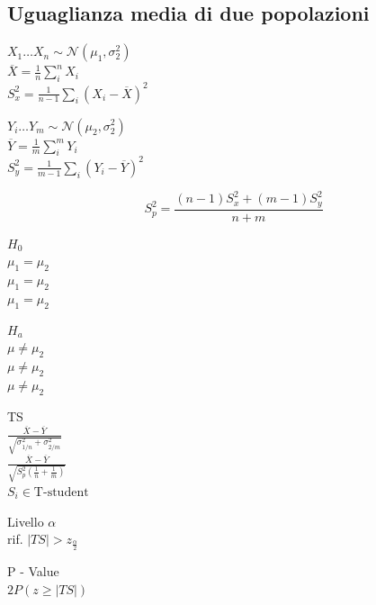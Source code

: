 \documentclass[]{article}
\begin{document}
    \subsection{Uguaglianza media di due popolazioni}
    \begin{minipage}{0.45\textwidth}
        $X_1 \ldots X_n \sim \mathcal{N}(\mu_1, \sigma_2^2)$ \\
        $\overline{X} = \frac{1}{n} \sum_{i}^{n} X_i$ \\
        $S_x^2 = \frac{1}{n - 1} \sum_{i}^{} (X_i - \overline{X})^2$
    \end{minipage}
    \begin{minipage}{0.45\textwidth}
        $Y_i \ldots Y_m \sim \mathcal{N} (\mu_2, \sigma_2^2)$ \\
        $\overline{Y} = \frac{1}{m} \sum_{i}^{m} Y_i$ \\
        $S_y^2 = \frac{1}{m-1} \sum_{i}^{} (Y_i - \overline{Y})^2$
    \end{minipage}
    \[ S_p^2 = \frac{(n-1)S_x^2 + (m-1)S_y^2}{n+m} \]
    \begin{minipage}{0.2\textwidth}
        $H_0$ \\[2ex]
        $\mu_1 = \mu_2$ \\[2ex]
        $\mu_1 = \mu_2$ \\[2ex]
        $\mu_1 = \mu_2$
    \end{minipage}
    \begin{minipage}{0.2\textwidth}
        $H_a$ \\[2ex]
        $\mu \not =  \mu_2$ \\[2ex]
        $\mu \not =  \mu_2$ \\[2ex]
        $\mu \not =  \mu_2$
    \end{minipage}
    \begin{minipage}{0.2\textwidth}
        TS \\[2ex]
        $\frac{\overline{X} - \overline{Y}}{\sqrt{\sigma^2_{1/n} + \sigma^2_{2/m}}}$ \\[2ex]
        $\frac{\overline{X} - \overline{Y}}{\sqrt{S_p^2(\frac{1}{n} + \frac{1}{m})}}$ \\[2ex]
        $S_i \in \text{T-student}$ 
    \end{minipage}
    \begin{minipage}{0.2\textwidth}
        Livello $\alpha$ \\[2ex]
        rif. $|TS| > z_{\frac{\alpha}{2}}$
    \end{minipage}
    \begin{minipage}{0.2\textwidth}
        P - Value \\[2ex]
        $2P(z\geq |TS|)$
    \end{minipage} 
\end{document}
